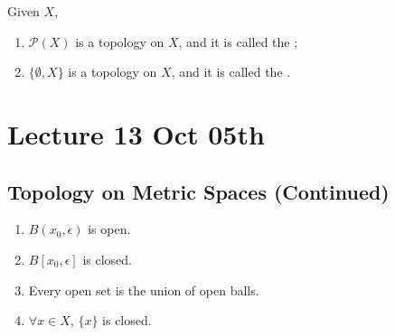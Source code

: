 \documentclass[notoc,notitlepage]{tufte-book}
\begin{document}
\begin{eg}
  Given $X$,
  \begin{enumerate}
    \item $\mathcal{P}(X)$ is a topology on $X$, and it is called the ;
    \item $\{ \emptyset, X \}$ is a topology on $X$, and it is called the .
  \end{enumerate}
\end{eg}



\chapter{Lecture 13 Oct 05th}%
\label{chp:lecture_13_oct_05th}

\section{Topology on Metric Spaces (Continued)}%
\label{sec:topology_on_metric_spaces_continued}

\begin{thm}\label{thm:open_balls_are_open}
  \begin{enumerate}
    \item $B(x_0, \epsilon)$ is open.
    \item $B[x_0, \epsilon]$ is closed.
    \item Every open set is the union of open balls.
    \item $\forall x \in X$, $\{ x \}$ is closed.
  \end{enumerate}
\end{thm}
\end{document}
